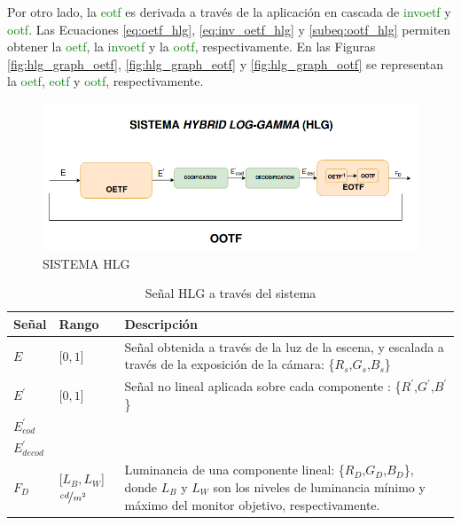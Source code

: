 \documentclass[a4paper, 12pt]{report}
\begin{document}
Por otro lado, la \textcolor{green}{eotf} es derivada a través de la aplicación en cascada de \textcolor{green}{invoetf} y \textcolor{green}{ootf}.   
Las Ecuaciones \ref{eq:oetf_hlg}, \ref{eq:inv_oetf_hlg} y \ref{subeq:ootf_hlg} permiten obtener la \textcolor{green}{oetf}, la \textcolor{green}{invoetf} y la \textcolor{green}{ootf}, respectivamente. En las Figuras \ref{fig:hlg_graph_oetf}, \ref{fig:hlg_graph_eotf} y \ref{fig:hlg_graph_ootf}  se representan la \textcolor{green}{oetf}, \textcolor{green}{eotf} y \textcolor{green}{ootf}, respectivamente.
\begin{figure}[H]
  \centering
  \includegraphics[width=12cm, keepaspectratio]{img/4_Formatos_de_TV_HDR/4_2_Sistema_HLG/1_Sistema_HLG.png}
  \caption{SISTEMA HLG}
  \label{fig:hlg_sist}
\end{figure}

\begin{table}[H]
    \begin{tabular}{|p{1.25cm}| p{3cm}|p{10.5cm}| }
       \hline 
        \textbf{Señal} &\textbf{Rango} & \textbf{Descripción} \\ \hline
        $E$ &[$0,1$]  &  Señal obtenida a través de la luz de la escena, y escalada a través de la exposición de la cámara: \{$R_{s}$,$G_{s}$,$B_{s}$\}   \\\hline
        $E^{'}$ &[$0,1$]  & Señal no lineal aplicada sobre cada componente : \{$R^{'}$,$G^{'}$,$B^{'}$\} \\\hline
        $E^{'}_{cod}$&    &  \\\hline
        $E^{'}_{decod}$ &    & \\\hline
        $F_D$& [$L_{B},L_{W}$] $\nicefrac{cd}{m^{2}}$ & Luminancia de una componente lineal: \{$R_{D}$,$G_{D}$,$B_{D}$\}, donde $L_B$  y $L_W$ son los niveles de luminancia mínimo y máximo del monitor objetivo, respectivamente. \\\hline
    \end{tabular}
    \caption{Señal HLG a través del sistema}
    \label{table:hlg_params}
\end{table}
\end{document}
